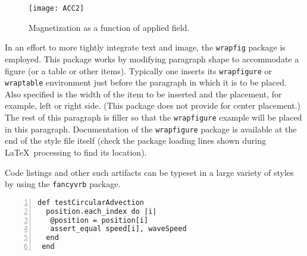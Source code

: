 \documentclass[draft]{aiaa-tc}%
\newcommand{\package}[1]{\texttt{#1}}
\begin{document}
\begin{wrapfigure}{R}{0.3\linewidth}
 \texttt{[image: ACC2]}
 \caption{Magnetization as a function of applied field.}
 \label{f:magnetic_field}
\end{wrapfigure}

In an effort to more tightly integrate text and image, the
\package{wrapfig} package is employed.
This package works by modifying paragraph shape to accommodate a figure
(or a table or other items).
Typically one inserts its \verb|wrapfigure| or \verb|wraptable|
environment just before the paragraph in which it is to be placed.
Also specified is the width of the item to be inserted and the
placement, for example, left or right side.
(This package does not provide for center placement.)
The rest of this paragraph is filler so that the \verb|wrapfigure|
example will be placed in this paragraph.
Documentation of the \package{wrapfigure} package is available at the
end of the style file itself (check the package loading lines shown
during \LaTeX\ processing to find its location).

Code listings and other such artifacts can be typeset in a large variety
of styles by using the \package{fancyvrb} package.
\begin{Verbatim}[numbers=left]
 def testCircularAdvection
  position.each_index do |i|
   @position = position[i]
   assert_equal speed[i], waveSpeed
  end
 end
\end{Verbatim}
\end{document}
